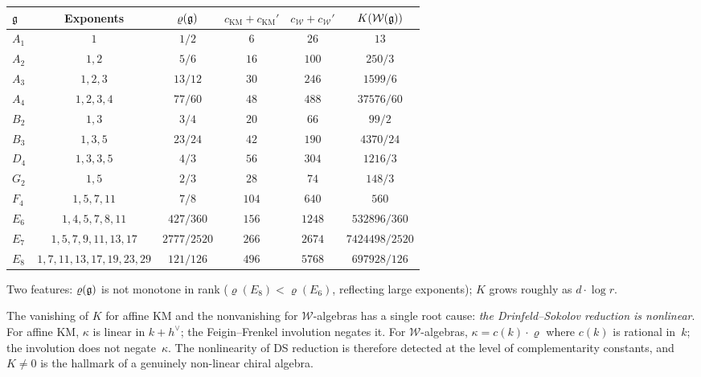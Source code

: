 \begin{computation}
\label{comp:thqg-IV-exponent-sums}
\renewcommand{\arraystretch}{1.4}
\begin{center}
\begin{tabular}{lccccc}
\toprule
$\mathfrak{g}$ & Exponents & $\varrho(\mathfrak{g})$ & $c_{\mathrm{KM}}+c_{\mathrm{KM}}'$ &
$c_{\mathcal{W}}+c_{\mathcal{W}}'$ & $K(\mathcal{W}(\mathfrak{g}))$ \\
\midrule
$A_1$ & $1$ & $1/2$ & $6$ & $26$ & $13$ \\
$A_2$ & $1, 2$ & $5/6$ & $16$ & $100$ & $250/3$ \\
$A_3$ & $1, 2, 3$ & $13/12$ & $30$ & $246$ & $1599/6$ \\
$A_4$ & $1, 2, 3, 4$ & $77/60$ & $48$ & $488$ & $37576/60$ \\
$B_2$ & $1, 3$ & $3/4$ & $20$ & $66$ & $99/2$ \\
$B_3$ & $1, 3, 5$ & $23/24$ & $42$ & $190$ & $4370/24$ \\
$D_4$ & $1, 3, 3, 5$ & $4/3$ & $56$ & $304$ & $1216/3$ \\
$G_2$ & $1, 5$ & $2/3$ & $28$ & $74$ & $148/3$ \\
$F_4$ & $1, 5, 7, 11$ & $7/8$ & $104$ & $640$ & $560$ \\
$E_6$ & $1, 4, 5, 7, 8, 11$ & $427/360$ & $156$ & $1248$ & $532896/360$ \\
$E_7$ & $1, 5, 7, 9, 11, 13, 17$ & $2777/2520$ & $266$ & $2674$ & $7424498/2520$ \\
$E_8$ & $1, 7, 11, 13, 17, 19, 23, 29$ & $121/126$ & $496$ & $5768$ & $697928/126$ \\
\bottomrule
\end{tabular}
\end{center}
Two features: $\varrho(\mathfrak{g})$ is not monotone in rank
($\varrho(E_8) < \varrho(E_6)$, reflecting large exponents);
$K$ grows roughly as $d \cdot \log r$.
\end{computation}

\begin{remark}[Structural content of $K = 0$ vs.\ $K \neq 0$]
\label{rem:thqg-IV-K-zero-vs-nonzero}
The vanishing of $K$ for affine KM and the nonvanishing for
$\mathcal{W}$-algebras has a single root cause:
\emph{the Drinfeld--Sokolov reduction is nonlinear}.
For affine KM, $\kappa$ is linear in $k + h^\vee$; the
Feigin--Frenkel involution negates it.
For $\mathcal{W}$-algebras, $\kappa = c(k) \cdot \varrho$ where
$c(k)$ is rational in~$k$; the involution does not negate~$\kappa$.
The nonlinearity of DS reduction is therefore detected at the level
of complementarity constants, and $K \neq 0$ is the hallmark of a
genuinely non-linear chiral algebra.
\end{remark}

